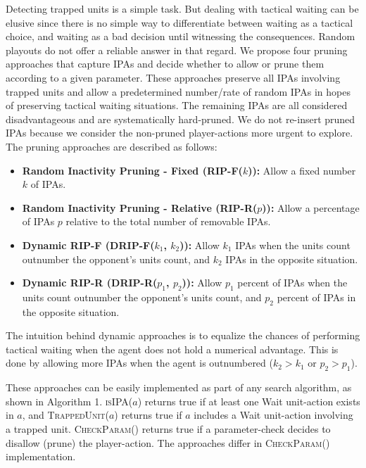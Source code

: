 \documentclass[conference]{IEEEtran}
\begin{document}
Detecting trapped units is a simple task. But dealing with tactical waiting can be elusive since there is no simple way to differentiate between waiting as a tactical choice, and waiting as a bad decision until witnessing the consequences. Random playouts do not offer a reliable answer in that regard. We propose four pruning approaches that capture IPAs and decide whether to allow or prune them according to a given parameter. These approaches preserve all IPAs involving trapped units and allow a predetermined number/rate of random IPAs in hopes of preserving tactical waiting situations. The remaining IPAs are all considered disadvantageous and are systematically hard-pruned. We do not re-insert pruned IPAs because we consider the non-pruned player-actions more urgent to explore. The pruning approaches are described as follows:

\begin{itemize}
\item \textbf{Random Inactivity Pruning - Fixed (RIP-F($k$)):} Allow a fixed number $k$ of IPAs.
\item \textbf{Random Inactivity Pruning - Relative (RIP-R($p$)):} Allow a percentage of IPAs $p$ relative to the total number of removable IPAs.
\item \textbf{Dynamic RIP-F (DRIP-F($k_1$, $k_2$)):} Allow $k_1$ IPAs when the units count outnumber the opponent's units count, and $k_2$ IPAs in the opposite situation.
\item \textbf{Dynamic RIP-R (DRIP-R($p_1$, $p_2$)):} Allow $p_1$ percent of IPAs when the units count outnumber the opponent's units count, and $p_2$ percent of IPAs in the opposite situation.
\end{itemize}

The intuition behind dynamic approaches is to equalize the chances of performing tactical waiting when the agent does not hold a numerical advantage. This is done by allowing more IPAs when the agent is outnumbered ($k_2 > k_1$ or $p_2 > p_1$).

These approaches can be easily implemented as part of any search algorithm, as shown in Algorithm 1. \textsc{isIPA($a$)} returns true if at least one Wait unit-action exists in $a$, and \textsc{TrappedUnit($a$)} returns true if $a$ includes a Wait unit-action involving a trapped unit. \textsc{CheckParam()} returns true if a parameter-check decides to disallow (prune) the player-action. The approaches differ in \textsc{CheckParam()} implementation.

\end{document}
